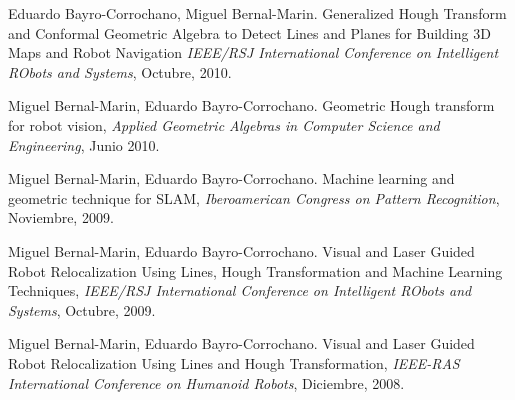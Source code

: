 
\begin{bibsection}
  \item Eduardo Bayro-Corrochano, Miguel Bernal-Marin.
        Generalized Hough Transform and Conformal Geometric Algebra
        to Detect Lines and Planes for  Building 3D Maps and Robot Navigation
        \emph{IEEE/RSJ International Conference on Intelligent RObots and
        Systems}, Octubre, 2010.

  \item Miguel Bernal-Marin, Eduardo Bayro-Corrochano.
        Geometric Hough transform for robot vision,
        \emph{Applied Geometric Algebras in Computer Science and Engineering},
        Junio 2010.

  \item Miguel Bernal-Marin, Eduardo Bayro-Corrochano.
        Machine learning and geometric technique for SLAM,
        \emph{Iberoamerican Congress on Pattern Recognition}, Noviembre, 2009.

  \item Miguel Bernal-Marin, Eduardo Bayro-Corrochano.
        Visual and Laser Guided Robot Relocalization Using Lines,
        Hough Transformation and Machine Learning Techniques,
        \emph{IEEE/RSJ International Conference on Intelligent RObots and
        Systems}, Octubre, 2009.

  \item Miguel Bernal-Marin, Eduardo Bayro-Corrochano.
        Visual and Laser Guided Robot Relocalization Using Lines and Hough
        Transformation, \emph{IEEE-RAS International Conference on
        Humanoid Robots}, Diciembre, 2008.
\end{bibsection}
